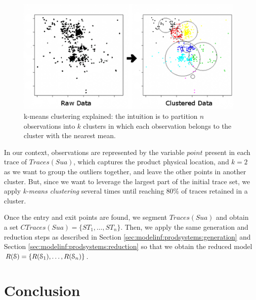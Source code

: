 \begin{figure}[ht]
    \begin{center}
        \includegraphics[width=1.0\linewidth]{figures/kmeans.png}
    \end{center}

    \caption{k-means clustering explained: the intuition is to
    partition $n$ observations into $k$ clusters in which each
    observation belongs to the cluster with the nearest mean.}
    \label{fig:kmeans}

\end{figure}

In our context, observations are represented by the variable
$point$ present in each trace of $Traces({Sua})$, which captures
the product physical location, and $k=2$ as we want to group the
outliers together, and leave the other points in another cluster.
But, since we want to leverage the largest part of the initial
trace set, we apply \textit{k-means clustering} several times
until reaching 80\% of traces retained in a cluster.

Once the entry and exit points are found, we segment
$Traces({Sua})$ and obtain a set $CTraces({Sua})=\{ST_1, \dots,
ST_n\}$. Then, we apply the same generation and reduction steps
as described in Section \ref{sec:modelinf:prodsystems:generation}
and Section \ref{sec:modelinf:prodsystems:reduction} so that we
obtain the reduced model $R(\EuScript{S}) =
\{R(\EuScript{S}_1),\dots,R(\EuScript{S}_n)\}$.


\section{Conclusion}
\label{sec:modelinf:prodsystems:conclusion}

